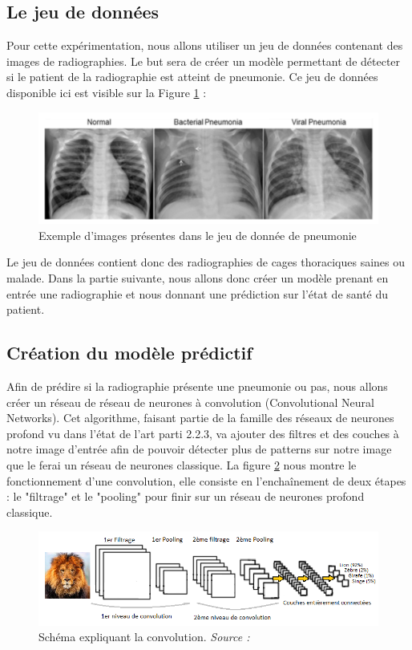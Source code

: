 \subsection{Le jeu de données}
Pour cette expérimentation, nous allons utiliser un jeu de données contenant des images de radiographies. Le but sera de créer un modèle permettant de détecter si le patient de la radiographie est atteint de pneumonie. Ce jeu de données disponible ici \cite{kagglePneumonia} est visible sur la Figure \ref{pneumoniaImg} :
\begin{figure}[h]
    \includegraphics[scale=0.7]{src_img/pneumoniaImg.png}
    \caption{Exemple d'images présentes dans le jeu de donnée de pneumonie}
    \label{pneumoniaImg}
\end{figure}
Le jeu de données contient donc des radiographies de cages thoraciques saines ou malade. Dans la partie suivante, nous allons donc créer un modèle prenant en entrée une radiographie et nous donnant une prédiction sur l'état de santé du patient.

\subsection{Création du modèle prédictif}
Afin de prédire si la radiographie présente une pneumonie ou pas, nous allons créer un réseau de réseau de neurones à convolution (Convolutional Neural Networks). Cet algorithme, faisant partie de la famille des réseaux de neurones profond vu dans l'état de l'art parti 2.2.3, va ajouter des filtres et des couches à notre image d'entrée afin de pouvoir détecter plus de patterns sur notre image que le ferai un réseau de neurones classique. La figure \ref{CNNExplain} nous montre le fonctionnement d'une convolution, elle consiste en l'enchaînement de deux étapes : le "filtrage" et le "pooling" pour finir sur un réseau de neurones profond classique.
\begin{figure}[h]
    \includegraphics[scale=0.7]{src_img/CNNExplain.png}
    \caption{Schéma expliquant la convolution. \textit{Source : \cite{CnnExplainArticle}}}
    \label{CNNExplain}
\end{figure}

